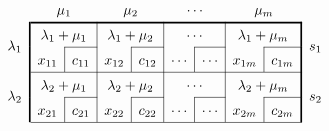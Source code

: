 \documentclass[11pt]{article}
\theoremstyle{definition}
\theoremstyle{remark}
\begin{document}
\begin{table}[ht!]
    \centering
    \[
        \renewcommand{\arraystretch}{1.5}
        \begin{array}{c
            !{\vrule width 1.2pt}
            cc|cc|cc|cc|c}

            \multicolumn{1}{c}{} &
            \multicolumn{2}{c}{\mu_1} &
            \multicolumn{2}{c}{\mu_2} &
            \multicolumn{2}{c}{\cdots} &
            \multicolumn{2}{c}{\mu_m} &
            \\

            \noalign{\global\arrayrulewidth=1.2pt}
            \cline{2-9}
            \noalign{\global\arrayrulewidth=0.4pt}

            \multirow{2}{*}{\(\lambda_1\)}
            &
            \multicolumn{2}{c|}{\lambda_1+\mu_1} &
            \multicolumn{2}{c|}{\lambda_1+\mu_2} &
            \multicolumn{2}{c|}{\cdots} &
            \multicolumn{2}{c!{\vrule width 1.2pt}}{\lambda_1+\mu_m} &
            \multirow{2}{*}{\(s_1\)}
            \\

            \cline{3-3}
            \cline{5-5}
            \cline{7-7}
            \cline{9-9}

            &
            x_{11} & \multicolumn{1}{|c|}{c_{11}} &
            x_{12} & \multicolumn{1}{|c|}{c_{12}} &
            \cdots & \multicolumn{1}{|c|}{\cdots} &
            x_{1m} & \multicolumn{1}{|c!{\vrule width 1.2pt}}{c_{1m}} &
            \\

            \cline{2-9}

            \multirow{2}{*}{\(\lambda_2\)}
            &
            \multicolumn{2}{c|}{\lambda_2+\mu_1} &
            \multicolumn{2}{c|}{\lambda_2+\mu_2} &
            \multicolumn{2}{c|}{\cdots} &
            \multicolumn{2}{c!{\vrule width 1.2pt}}{\lambda_2+\mu_m} &
            \multirow{2}{*}{\(s_2\)}
            \\

            \cline{3-3}
            \cline{5-5}
            \cline{7-7}
            \cline{9-9}

            &
            x_{21} & \multicolumn{1}{|c|}{c_{21}} &
            x_{22} & \multicolumn{1}{|c|}{c_{22}} &
            \cdots & \multicolumn{1}{|c|}{\cdots} &
            x_{2m} & \multicolumn{1}{|c!{\vrule width 1.2pt}}{c_{2m}} &
            \\

            \cline{2-9}


\end{array}\]
\end{table}
\end{document}
